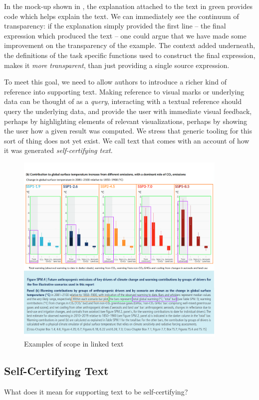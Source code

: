 In the mock-up shown in , the explanation attached to the text in
green provides code which helps explain the text. We can immediately see the continuum of
transparency: if the explanation simply provided the first line -- the final expression which
produced the text -- one could argue that we have made some improvement on the transparency
of the example. The context added underneath, the definitions of the task specific functions
used to construct the final expression, makes it \emph{more transparent}, than just 
providing a single source expression.


To meet this goal, we need to allow authors to introduce a richer kind of reference into supporting
text. Making reference to visual marks or underlying data can be thought of as a \emph{query},
interacting with a textual reference should query the underlying data, and provide the user with immediate
visual feedback, perhaps by highlighting elements of relevant visualizations, perhaps by showing the user
how a given result was computed. We stress that generic tooling for this sort of thing does not yet exist.
We call text that comes with an account of how it was generated \emph{self-certifying text}.

\begin{figure}
   \includegraphics[width=0.9\textwidth]{fig/ipcc-visual-elements.png}
   \caption{Examples of scope in linked text}
   \label{fig:visual-element-scope}
\end{figure}

\subsection{Self-Certifying Text}
What does it mean for supporting text to be self-certifying? 

